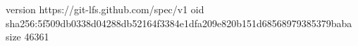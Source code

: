 version https://git-lfs.github.com/spec/v1
oid sha256:5f509db0338d04288db52164f3384e1dfa209e820b151d68568979385379baba
size 46361
